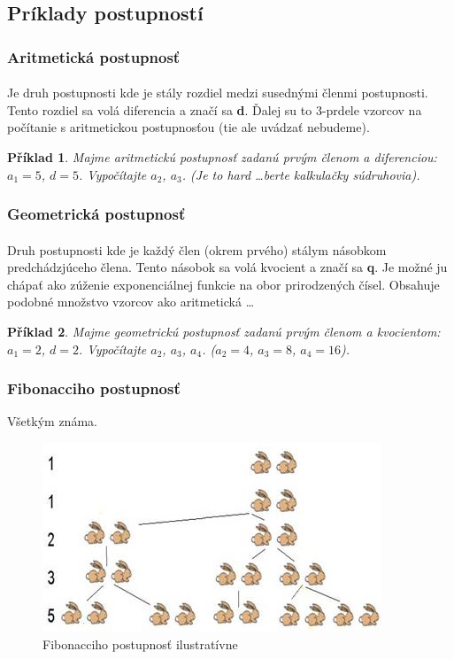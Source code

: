 \documentclass[12pt,a4paper]{article}
\newtheorem{example}{Příklad}
\begin{document}
\subsection{Príklady postupností}
\subsubsection{Aritmetická postupnosť}
\paragraph{}
Je druh postupnosti kde je stály rozdiel medzi susednými členmi postupnosti. Tento rozdiel sa volá diferencia a značí sa \textbf{d}. Ďalej su to 3-prdele vzorcov na počítanie s aritmetickou postupnosťou (tie ale uvádzať nebudeme).

\begin{example}
	Majme aritmetickú postupnosť zadanú prvým členom a diferenciou: $a_{1}=5$, $d=5$. Vypočítajte $a_{2}$, $a_{3}$. (Je to hard \dots berte kalkulačky súdruhovia).
\end{example}

\subsubsection{Geometrická postupnosť}
\paragraph{}
Druh postupnosti kde je každý člen (okrem prvého) stálym násobkom predchádzjúceho člena. Tento násobok sa volá kvocient a značí sa \textbf{q}. Je možné ju chápať ako zúženie exponenciálnej funkcie na obor prirodzených čísel. Obsahuje podobné množstvo vzorcov ako aritmetická \dots

\begin{example}
	Majme geometrickú postupnosť zadanú prvým členom a kvocientom: $a_{1}=2$, $d=2$. Vypočítajte $a_{2}$, $a_{3}$, $a_{4}$. ($a_{2}=4$, $a_{3}=8$, $a_{4}=16$).
\end{example}

\subsubsection{Fibonacciho postupnosť}
Všetkým známa.

\begin{figure}[H]
	\begin{center}
		\includegraphics[scale=1]{img/fibonacci}
	\end{center}
	\caption{Fibonacciho postupnosť ilustratívne}
\end{figure}
\end{document}
